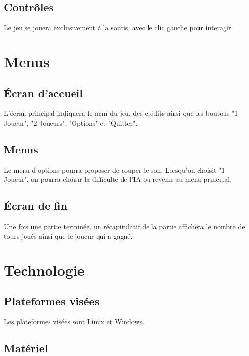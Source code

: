 \documentclass[a4paper]{scrreprt}
\begin{document}
\section{Contrôles}
Le jeu se jouera exclusivement à la souris, avec le clic gauche pour interagir.



\chapter{Menus}

\section{\'Ecran d'accueil}

L'écran principal indiquera le nom du jeu, des crédits ainsi que les boutons "1 Joueur", "2 Joueurs", "Options" et "Quitter".

\section{Menus}

Le menu d'options pourra proposer de couper le son.
Lorsqu'on choisit "1 Joueur", on pourra choisir la difficulté de l'IA ou revenir au menu principal.

\section{\'Ecran de fin}

Une fois une partie terminée, un récapitulatif de la partie affichera le nombre de tours joués ainsi que le joueur qui a gagné.



\chapter{Technologie}


\section{Plateformes visées}
Les plateformes visées sont Linux et Windows.

\section{Matériel}
\end{document}
